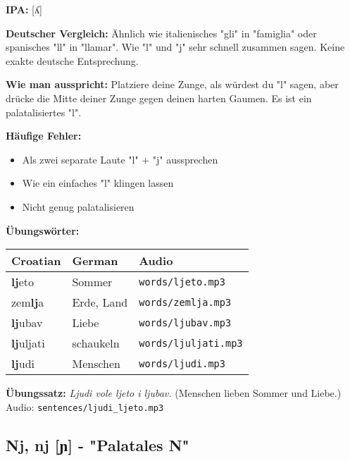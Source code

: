 \begin{tcolorbox}[breakable, colback=lightgreen!30, colframe=green!60!black, title=\textbf{Lj, lj}]

\textbf{IPA:} [ʎ]

\textbf{Deutscher Vergleich:}
Ähnlich wie italienisches "gli" in "famiglia" oder spanisches "ll" in "llamar". Wie "l" und "j" sehr schnell zusammen sagen. Keine exakte deutsche Entsprechung.

\textbf{Wie man ausspricht:}
Platziere deine Zunge, als würdest du "l" sagen, aber drücke die Mitte deiner Zunge gegen deinen harten Gaumen. Es ist ein palatalisiertes "l".

\textbf{Häufige Fehler:}
\begin{itemize}
    \item Als zwei separate Laute "l" + "j" aussprechen
    \item Wie ein einfaches "l" klingen lassen
    \item Nicht genug palatalisieren
\end{itemize}

\textbf{Übungswörter:}
\begin{center}
\small
\begin{tabular}{lll}
\textbf{Croatian} & \textbf{German} & \textbf{Audio} \\
\midrule
\textbf{lj}eto & Sommer & \small\texttt{words/ljeto.mp3} \\
zem\textbf{lj}a & Erde, Land & \small\texttt{words/zemlja.mp3} \\
\textbf{lj}ubav & Liebe & \small\texttt{words/ljubav.mp3} \\
\textbf{lj}uljati & schaukeln & \small\texttt{words/ljuljati.mp3} \\
\textbf{lj}udi & Menschen & \small\texttt{words/ljudi.mp3} \\
\end{tabular}
\end{center}

\textbf{Übungssatz:}
\textit{Ljudi vole ljeto i ljubav.}
(Menschen lieben Sommer und Liebe.)
Audio: \small\texttt{sentences/ljudi\_ljeto.mp3}

\end{tcolorbox}

\subsection{Nj, nj [ɲ] - "Palatales N"}


